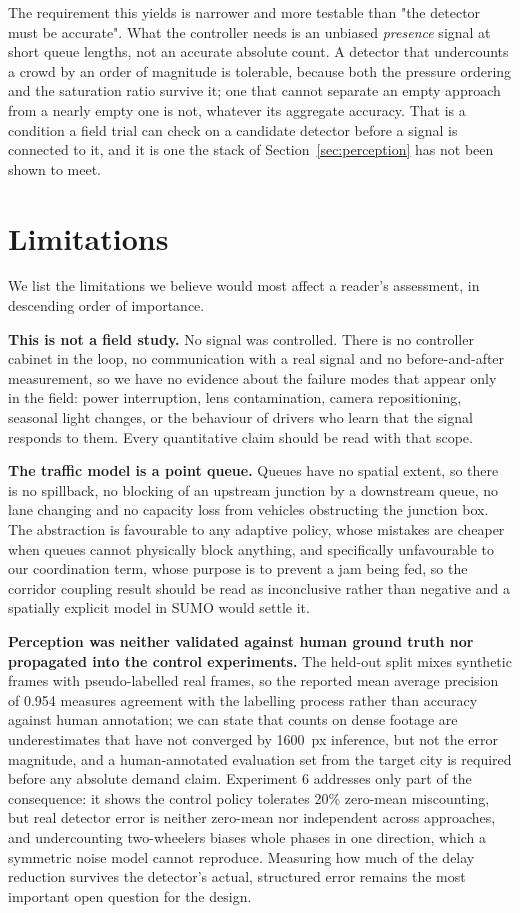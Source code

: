 \documentclass[journal]{IEEEtran}
\begin{document}
The requirement this yields is narrower and more testable than "the detector must be accurate".
What the controller needs is an unbiased \emph{presence} signal at short queue lengths, not an
accurate absolute count. A detector that undercounts a crowd by an order of magnitude is tolerable,
because both the pressure ordering and the saturation ratio survive it; one that cannot separate an
empty approach from a nearly empty one is not, whatever its aggregate accuracy. That is a condition
a field trial can check on a candidate detector before a signal is connected to it, and it is one
the stack of Section~\ref{sec:perception} has not been shown to meet.

\section{Limitations}
\label{sec:limitations}

We list the limitations we believe would most affect a reader's assessment, in descending order of
importance.

\textbf{This is not a field study.} No signal was controlled. There is no controller cabinet in the loop,
no communication with a real signal and no before-and-after measurement, so we have no evidence about the
failure modes that appear only in the field: power interruption, lens contamination, camera
repositioning, seasonal light changes, or the behaviour of drivers who learn that the signal responds to
them. Every quantitative claim should be read with that scope.

\textbf{The traffic model is a point queue.} Queues have no spatial extent, so there is no spillback, no
blocking of an upstream junction by a downstream queue, no lane changing and no capacity loss from
vehicles obstructing the junction box. The abstraction is favourable to any adaptive policy, whose
mistakes are cheaper when queues cannot physically block anything, and specifically unfavourable to our
coordination term, whose purpose is to prevent a jam being fed, so the corridor coupling result should be
read as inconclusive rather than negative and a spatially explicit model in SUMO
\cite{lopez2018microscopic} would settle it.

\textbf{Perception was neither validated against human ground truth nor propagated into the control
experiments.} The held-out split mixes synthetic frames with pseudo-labelled real frames, so the
reported mean average precision of 0.954 measures agreement with the labelling process rather than
accuracy against human annotation; we can state that counts on dense footage are underestimates that have
not converged by 1600~px inference, but not the error magnitude, and a human-annotated evaluation set from
the target city is required before any absolute demand claim. Experiment 6 addresses only part of the
consequence: it shows the control policy tolerates 20\% zero-mean miscounting, but real detector error is
neither zero-mean nor independent across approaches, and undercounting two-wheelers biases whole phases in
one direction, which a symmetric noise model cannot reproduce. Measuring how much of the delay reduction
survives the detector's actual, structured error remains the most important open question for the design.
\end{document}
